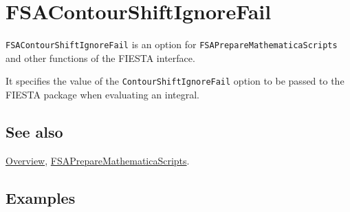 \documentclass[../FeynHelpersManual.tex]{subfiles}
\begin{document}
\hypertarget{fsacontourshiftignorefail}{
\section{FSAContourShiftIgnoreFail}\label{fsacontourshiftignorefail}}

\texttt{FSAContourShiftIgnoreFail} is an option for
\texttt{FSAPrepareMathematicaScripts} and other functions of the FIESTA
interface.

It specifies the value of the \texttt{ContourShiftIgnoreFail} option to
be passed to the FIESTA package when evaluating an integral.

\subsection{See also}

\hyperlink{toc}{Overview},
\hyperlink{fsapreparemathematicascripts}{FSAPrepareMathematicaScripts}.

\subsection{Examples}
\end{document}
